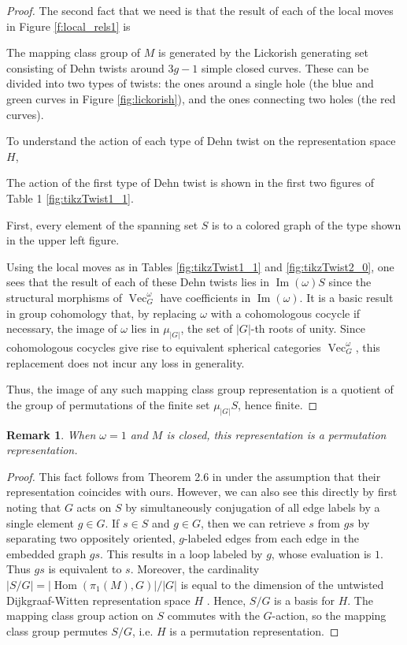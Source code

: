 \documentclass{amsart}
\newtheorem{rmk}[thm]{Remark}
\DeclareMathOperator{\Vect}{Vec}
\DeclareMathOperator{\Hom}{Hom}
\DeclareMathOperator{\Img}{Im}
\begin{document}
\begin{proof}
The second fact that we need is that the result of each of the local moves in Figure \ref{f:local_rels1} is


The mapping class group of $M$ is generated by the Lickorish generating set consisting of Dehn twists around $3g-1$ simple closed curves.   These can be divided into two types of twists: the ones around a single hole (the blue and green curves in Figure \ref{fig:lickorish}), and the ones connecting two holes (the red curves).


To understand the action of each type of Dehn twist on the representation space $H$, 


The action of the first type of Dehn twist is shown in the first two figures of Table 1 \ref{fig:tikzTwist1_1}.  

First, every element of the spanning set $S$ is  to a colored graph of the type shown in the upper left figure.  

Using the local moves as in Tables \ref{fig:tikzTwist1_1} and \ref{fig:tikzTwist2_0}, one sees that the result of each of these Dehn twists lies in $\Img(\omega) S$ since the structural morphisms of $\Vect_G^\omega$ have coefficients in $\Img(\omega)$.  It is a basic result in group cohomology that, by replacing $\omega$ with a cohomologous cocycle if necessary,  the image of $\omega$ lies in $\mu_{|G|}$, the set of $|G|$-th roots of unity.  Since cohomologous cocycles give rise to equivalent spherical categories $\Vect_G^\omega$, this replacement does not incur any loss in generality.

Thus, the image of any such mapping class group representation is a quotient of the group of permutations of the finite set $\mu_{|G|} S$, hence finite.
\end{proof}

\begin{rmk} 
When $\omega = 1$ and $M$ is closed, this representation is a permutation representation.  
\end{rmk}

\begin{proof}
This fact follows from Theorem 2.6 in \cite{fjfu} under the assumption that their representation coincides with ours.  However, we can also see this directly by first noting that $G$ acts on $S$ by simultaneously conjugation of all edge labels by a single element $g \in G$.  If $s \in S$ and $g \in G$, then we can retrieve $s$ from $gs$ by separating two oppositely oriented, $g$-labeled edges from each edge in the embedded graph $gs$.  This results in a loop labeled by $g$, whose evaluation is $1$.  Thus $gs$ is equivalent to $s$.  Moreover, the cardinality $|S/G| = |\Hom(\pi_1(M), G)|/|G|$ is equal to the dimension of the untwisted Dijkgraaf-Witten representation space $H$ \cite{dijkgraaf1990}.  Hence, $S/G$ is a basis for $H$.  The mapping class group action on $S$ commutes with the $G$-action, so the mapping class group permutes $S/G$, i.e. $H$ is a permutation representation.
\end{proof}
\end{document}
